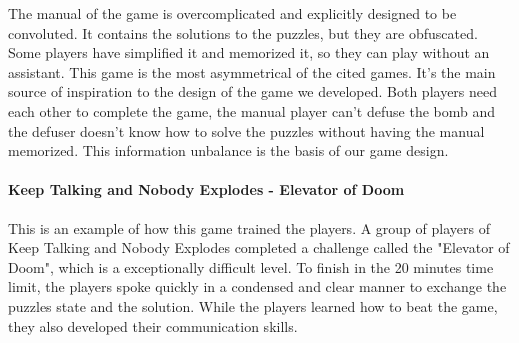 \documentclass[12pt]{article}
\begin{document}
\vfill
{}

\vspace{0.4cm}
The manual of the game is overcomplicated and explicitly designed to be convoluted. It contains the solutions to the puzzles, but they are obfuscated. Some players have simplified it and memorized it, so they can play without an assistant. This game is the most asymmetrical of the cited games. It's the main source of inspiration to the design of the game we developed. Both players need each other to complete the game, the manual player can't defuse the bomb and the defuser doesn't know how to solve the puzzles without having the manual memorized. This information unbalance is the basis of our game design.

\paragraph{Keep Talking and Nobody Explodes - Elevator of Doom \cite{ktneelevator}}
This is an example of how this game trained the players. A group of players of Keep Talking and Nobody Explodes completed a challenge called the "Elevator of Doom", which is a exceptionally difficult level. To finish in the 20 minutes time limit, the players spoke quickly in a condensed and clear manner to exchange the puzzles state and the solution. While the players learned how to beat the game, they also developed their communication skills.

\vfill
{}
\end{document}

